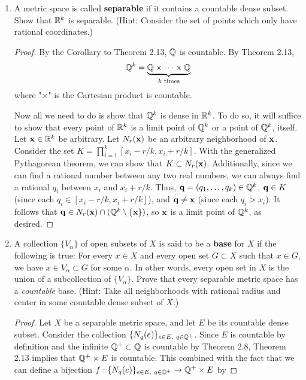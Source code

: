 \documentclass[../psets.tex]{subfiles}
\begin{document}
\begin{enumerate}[label={\textbf{\arabic*.}}]
\begin{enumerate}
\begin{proof}
        \end{proof}
    \end{enumerate}
    \item A metric space is called \textbf{separable} if it contains a countable dense subset. Show that $\mathbb{R}^k$ is separable. (Hint: Consider the set of points which only have rational coordinates.)
    \begin{proof}
        By the Corollary to Theorem 2.13, $\mathbb{Q}$ is countable. By Theorem 2.13,
        \begin{equation*}
            \mathbb{Q}^k = \underbrace{\mathbb{Q}\times\cdots\times\mathbb{Q}}_{k\text{ times}}
        \end{equation*}
        where "$\times$" is the Cartesian product is countable.\par
        Now all we need to do is show that $\mathbb{Q}^k$ is dense in $\mathbb{R}^k$. To do so, it will suffice to show that every point of $\mathbb{R}^k$ is a limit point of $\mathbb{Q}^k$ or a point of $\mathbb{Q}^k$, itself. Let $\mathbf{x}\in\mathbb{R}^k$ be arbitrary. Let $N_r(\mathbf{x})$ be an arbitrary neighborhood of $\mathbf{x}$. Consider the set $K=\prod_{i=1}^k[x_i-r/k,x_i+r/k]$. With the generalized Pythagorean theorem, we can show that $K\subset N_r(\mathbf{x})$. Additionally, since we can find a rational number between any two real numbers, we can always find a rational $q_i$ between $x_i$ and $x_i+r/k$. Thus, $\mathbf{q}=(q_1,\dots,q_k)\in\mathbb{Q}^k$, $\mathbf{q}\in K$ (since each $q_i\in[x_i-r/k,x_i+r/k]$), and $\mathbf{q}\neq\mathbf{x}$ (since each $q_i>x_i$). It follows that $\mathbf{q}\in N_r(\mathbf{x})\cap(\mathbb{Q}^k\setminus\{\mathbf{x}\})$, so $\mathbf{x}$ is a limit point of $\mathbb{Q}^k$, as desired.
    \end{proof}
    \item A collection $\{V_\alpha\}$ of open subsets of $X$ is said to be a \textbf{base} for $X$ if the following is true: For every $x\in X$ and every open set $G\subset X$ such that $x\in G$, we have $x\in V_\alpha\subset G$ for some $\alpha$. In other words, every open set in $X$ is the union of a subcollection of $\{V_\alpha\}$. Prove that every separable metric space has a \emph{countable} base. (Hint: Take all neighborhoods with rational radius and center in some countable dense subset of $X$.)
    \begin{proof}
        Let $X$ be a separable metric space, and let $E$ be its countable dense subset. Consider the collection $\{N_q(e)\}_{e\in E,\ q\in\mathbb{Q}^+}$. Since $E$ is countable by definition and the infinite $\mathbb{Q}^+\subset\mathbb{Q}$ is countable by Theorem 2.8, Theorem 2.13 implies that $\mathbb{Q}^+\times E$ is countable. This combined with the fact that we can define a bijection $f:\{N_q(e)\}_{e\in E,\ q\in\Q^+}\to\Q^+\times E$ by

\end{proof}
\end{enumerate}
\end{document}
